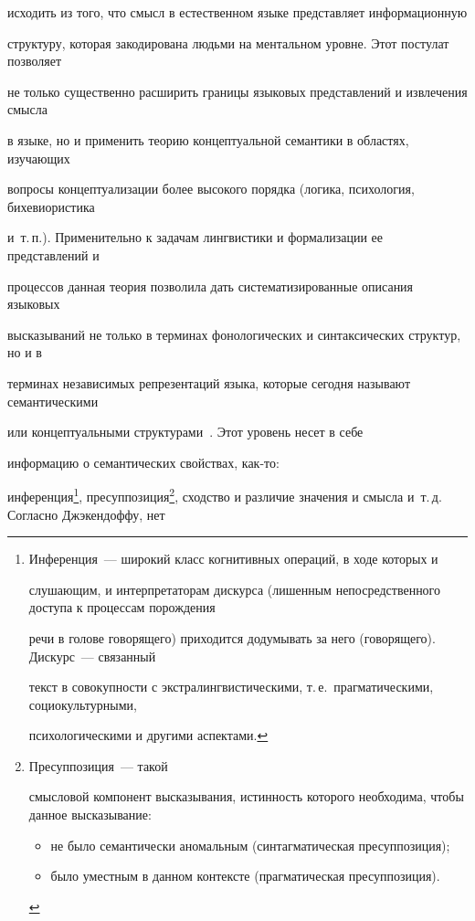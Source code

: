 исходить из того, что смысл в естественном языке представляет информационную 


структуру, которая закодирована людьми на ментальном уровне. Этот постулат позволяет 


не только существенно расширить границы языковых представлений и извлечения смысла 


в языке, но и применить теорию концептуальной семантики в областях, изучающих 


вопросы концептуализации более высокого порядка (логика, психология, бихевиористика 


и~т.\,п.). Применительно к задачам лингвистики и формализации ее представлений и 


процессов данная теория позволила дать систематизированные описания языковых 


высказываний не только в терминах фонологических и синтаксических структур, но и в 


терминах независимых  репрезентаций языка, которые сегодня называют семантическими 


или концептуальными структурами~\cite{21-2-11, 22-2-11}. Этот уровень несет в себе 


информацию о семантических свойствах, как-то: 


инференция\footnote{{Инференция}~--- широкий класс когнитивных операций, в ходе которых и 


слушающим, и интерпретаторам дискурса (лишенным непосредственного доступа к процессам порождения 


речи в голове говорящего) приходится додумывать за него (говорящего). {Дискурс}~--- связанный 


текст в совокупности с экстралингвистическими, т.\,е.\ прагматическими, социокультурными, 


психологическими и другими аспектами.}, пресуппозиция\footnote{{Пресуппозиция}~--- такой 


смысловой компонент высказывания, истинность которого необходима, чтобы данное высказывание:


\begin{itemize}


    \item  не было семантически аномальным (синтагматическая пресуппозиция);


\item было уместным в данном контексте (прагматическая пресуппозиция).


\end{itemize}}, сходство и различие значения и смысла и~т.\,д. Согласно Джэкендоффу, нет 


